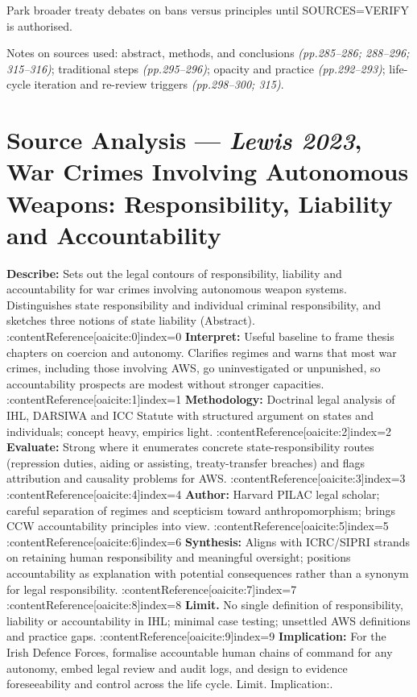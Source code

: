 Park broader treaty debates on bans versus principles until SOURCES=VERIFY is authorised.

Notes on sources used: abstract, methods, and conclusions \emph{(pp.285–286; 288–296; 315–316)}; traditional steps \emph{(pp.295–296)}; opacity and practice \emph{(pp.292–293)}; life-cycle iteration and re-review triggers \emph{(pp.298–300; 315)}.

\parencite{LEWIS_2023}
\section*{Source Analysis — \textit{Lewis 2023}, War Crimes Involving Autonomous Weapons: Responsibility, Liability and Accountability}
\textbf{Describe:} Sets out the legal contours of responsibility, liability and accountability for war crimes involving autonomous weapon systems. Distinguishes state responsibility and individual criminal responsibility, and sketches three notions of state liability (Abstract). :contentReference[oaicite:0]{index=0}  
\textbf{Interpret:} Useful baseline to frame thesis chapters on coercion and autonomy. Clarifies regimes and warns that most war crimes, including those involving AWS, go uninvestigated or unpunished, so accountability prospects are modest without stronger capacities. :contentReference[oaicite:1]{index=1}  
\textbf{Methodology:} Doctrinal legal analysis of IHL, DARSIWA and ICC Statute with structured argument on states and individuals; concept heavy, empirics light. :contentReference[oaicite:2]{index=2}  
\textbf{Evaluate:} Strong where it enumerates concrete state-responsibility routes (repression duties, aiding or assisting, treaty-transfer breaches) and flags attribution and causality problems for AWS. :contentReference[oaicite:3]{index=3} :contentReference[oaicite:4]{index=4}  
\textbf{Author:} Harvard PILAC legal scholar; careful separation of regimes and scepticism toward anthropomorphism; brings CCW accountability principles into view. :contentReference[oaicite:5]{index=5} :contentReference[oaicite:6]{index=6}  
\textbf{Synthesis:} Aligns with ICRC/SIPRI strands on retaining human responsibility and meaningful oversight; positions accountability as explanation with potential consequences rather than a synonym for legal responsibility. :contentReference[oaicite:7]{index=7} :contentReference[oaicite:8]{index=8}  
\textbf{Limit.} No single definition of responsibility, liability or accountability in IHL; minimal case testing; unsettled AWS definitions and practice gaps. :contentReference[oaicite:9]{index=9}  
\textbf{Implication:} For the Irish Defence Forces, formalise accountable human chains of command for any autonomy, embed legal review and audit logs, and design to evidence foreseeability and control across the life cycle. Limit. Implication:.

